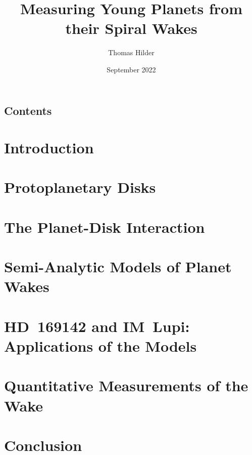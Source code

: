 \documentclass[hidelinks,11pt,a4paper,onecolumn]{report}
\title{Measuring Young Planets from their Spiral Wakes}
\author{Thomas Hilder}
\date{September 2022}
\makeatletter
\def\tableofcontents{\section*{\centering\Large Contents}\@starttoc{toc}}
\makeatother
\begin{document}
    
    

    

    

    

    

    \tableofcontents
    \clearpage

    \setcounter{footnote}{0} 

    \chapter{Introduction}
    
 
    \chapter{Protoplanetary Disks} \label{ch:disks}
    

    \chapter{The Planet-Disk Interaction} \label{ch:planetdisk}
    

    \chapter{Semi-Analytic Models of Planet Wakes} \label{ch:wake_models}
    


    \chapter{HD~169142 and IM~Lupi: Applications of the Models} \label{ch:HD169_IMLUP}
    

    \chapter{Quantitative Measurements of the Wake} \label{ch:fitting}
    

    \chapter{Conclusion}
    

    \appendix
    

    
    
\end{document}
